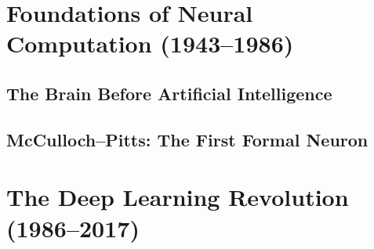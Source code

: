 




\frontmatter





\tableofcontents
\clearpage
\listoffigures
\clearpage
\listoftables

\mainmatter

\part{Foundations of Neural Computation (1943–1986)}

\chapter{The Brain Before Artificial Intelligence}


\chapter{McCulloch--Pitts: The First Formal Neuron}



\part{The Deep Learning Revolution (1986–2017)}

